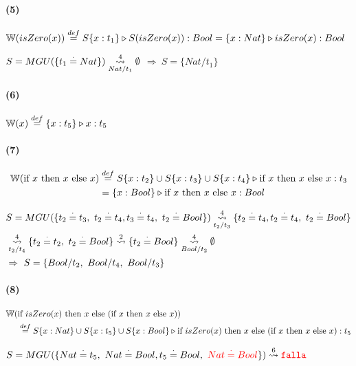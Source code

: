 \documentclass[10pt,a4paper]{article}
\begin{document}
\paragraph{(5)} $\WFunc(isZero(x)) \equalDef \judgeType{S\{x:t_1\}}{S(isZero(x))}{Bool} = \judgeType{\{x:Nat\}}{isZero(x)}{Bool}$ 
\begin{centrado}
$S = MGU(\{t_1 \equalDot Nat\}) \goesTo{4}{Nat/t_1} \emptyset$ $\Rightarrow~S = \{Nat/t_1\}$
\end{centrado}

\paragraph{(6)} $\WFunc(x) \equalDef \judgeType{\{x:t_5\}}{x}{t_5}$

\paragraph{(7)} 
\begin{align*}
\WFunc(\lambdaIf{x}{x}{x}) &\equalDef \judgeType{S\{x:t_2\}\cup S\{x:t_3\}\cup S\{x:t_4\}}{\lambdaIf{x}{x}{x}}{t_3}\\ &= \judgeType{\{x:Bool\}}{\lambdaIf{x}{x}{x}}{Bool}
\end{align*}

\begin{align*}
&S = MGU(\{t_2 \equalDot t_3,~t_2 \equalDot t_4, t_3 \equalDot t_4,~t_2 \equalDot Bool\}) \goesTo{4}{t_2/t_3} \{t_2 \equalDot t_4, t_2 \equalDot t_4,~t_2 \equalDot Bool\} \\ &\goesTo{4}{t_2/t_4} \{t_2 \equalDot t_2,~t_2 \equalDot Bool\} \goesTo{2}{} \{t_2 \equalDot Bool\} \goesTo{4}{Bool/t_2} \emptyset \\
&\Rightarrow~S = \{Bool/t_2,~Bool/t_4,~Bool/t_3\}
\end{align*}


\paragraph{(8)}
\begin{align*}
\WFunc(&\lambdaIf{isZero(x)}{x}{(\lambdaIf{x}{x}{x}})) \\
&\equalDef \judgeType{S\{x:Nat\}\cup S\{x:t_5\}\cup S\{x:Bool\}}{\lambdaIf{isZero(x)}{x}{(\lambdaIf{x}{x}{x}})}{t_5}\\ 
\end{align*}

$S = MGU(\{Nat \equalDot t_5,~Nat \equalDot Bool, t_5 \equalDot Bool,~\red{Nat \equalDot Bool}\}) \goesTo{6}{} \falla$
\end{document}
